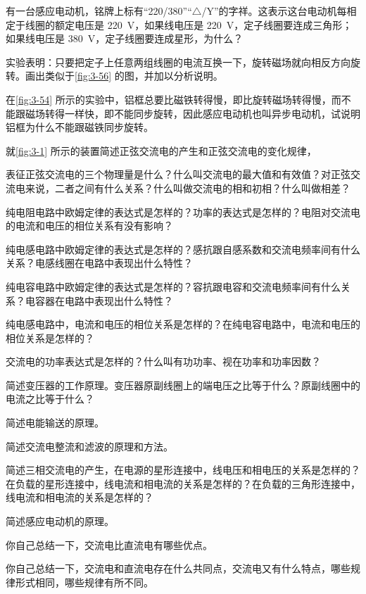 \begin{Practice}
\begin{question}
  \item 有一台感应电动机，铭牌上标有“220/380”“$\triangle$/Y”的字祥。这表示这台电动机每相定于线圈的额定电压是 \qty{220}{V}，如果线电压是 \qty{220}{V}，定子线圈要连成三角形；如果线电压是 \qty{380}{V}，定子线圈要连成星形，为什么？
  \item 实验表明：只要把定子上任意两组线圈的电流互换一下，旋转磁场就向相反方向旋转。画出类似于\cref{fig:3-56} 的图，并加以分析说明。
  \item 在\cref{fig:3-54} 所示的实验中，铝框总要比磁铁转得慢，即比旋转磁场转得慢，而不能跟磁场转得一样快，即不能同步旋转，因此感应电动机也叫异步电动机，试说明铝框为什么不能跟磁铁同步旋转。
\end{question}
\end{Practice}

\begin{Review}
\begin{question}
\item 就\cref{fig:3-1} 所示的装置简述正弦交流电的产生和正弦交流电的变化规律，
\item 表征正弦交流电的三个物理量是什么？什么叫交流电的最大值和有效值？对正弦交流电来说，二者之间有什么关系？什么叫做交流电的相和初相？什么叫做相差？
\item 纯电阻电路中欧姆定律的表达式是怎样的？功率的表达式是怎样的？电阻对交流电的电流和电压的相位关系有没有影响？
\item 纯电感电路中欧姆定律的表达式是怎样的？感抗跟自感系数和交流电频率间有什么关系？电感线圈在电路中表现出什么特性？
\item 纯电容电路中欧姆定律的表达式是怎样的？容抗跟电容和交流电频率间有什么关系？电容器在电路中表现出什么特性？
\item 纯电感电路中，电流和电压的相位关系是怎样的？在纯电容电路中，电流和电压的相位关系是怎样的？
\item 交流电的功率表达式是怎样的？什么叫有功功率、视在功率和功率因数？
\item 简述变压器的工作原理。变压器原副线圈上的端电压之比等于什么？原副线圈中的电流之比等于什么？
\item 简述电能输送的原理。
\item 简述交流电整流和滤波的原理和方法。
\item 简述三相交流电的产生，在电源的星形连接中，线电压和相电压的关系是怎样的？在负载的星形连接中，线电流和相电流的关系是怎样的？在负载的三角形连接中，线电流和相电流的关系是怎样的？
\item 简述感应电动机的原理。
\item 你自己总结一下，交流电比直流电有哪些优点。
\item 你自己总结一下，交流电和直流电存在什么共同点，交流电又有什么特点，哪些规律形式相同，哪些规律有所不同。
\end{question}
\end{Review}

